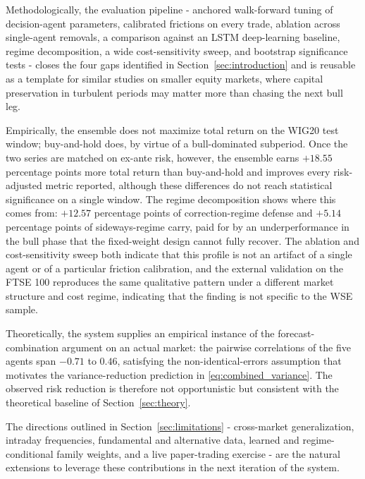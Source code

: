 \documentclass{ieeeaccess}
\newcommand{\VolScaledExcessPP}{\ensuremath{+18.55}}
\newcommand{\CorrectionDefencePP}{\ensuremath{+12.57}}
\newcommand{\SidewaysExcessPP}{\ensuremath{+5.14}}
\newcommand{\CorrMin}{\ensuremath{-0.71}}
\newcommand{\CorrMax}{\ensuremath{0.46}}
\begin{document}
Methodologically, the evaluation pipeline - anchored walk-forward tuning of decision-agent parameters, calibrated frictions on every trade, ablation across single-agent removals, a comparison against an LSTM deep-learning baseline, regime decomposition, a wide cost-sensitivity sweep, and bootstrap significance tests - closes the four gaps identified in Section~\ref{sec:introduction} and is reusable as a template for similar studies on smaller equity markets, where capital preservation in turbulent periods may matter more than chasing the next bull leg.

Empirically, the ensemble does not maximize total return on the WIG20 test window; buy-and-hold does, by virtue of a bull-dominated subperiod. Once the two series are matched on ex-ante risk, however, the ensemble earns $\VolScaledExcessPP$ percentage points more total return than buy-and-hold and improves every risk-adjusted metric reported, although these differences do not reach statistical significance on a single window. The regime decomposition shows where this comes from: $\CorrectionDefencePP$ percentage points of correction-regime defense and $\SidewaysExcessPP$ percentage points of sideways-regime carry, paid for by an underperformance in the bull phase that the fixed-weight design cannot fully recover. The ablation and cost-sensitivity sweep both indicate that this profile is not an artifact of a single agent or of a particular friction calibration, and the external validation on the FTSE 100 reproduces the same qualitative pattern under a different market structure and cost regime, indicating that the finding is not specific to the WSE sample.

Theoretically, the system supplies an empirical instance of the forecast-combination argument on an actual market: the pairwise correlations of the five agents span $\CorrMin$ to $\CorrMax$, satisfying the non-identical-errors assumption that motivates the variance-reduction prediction in \eqref{eq:combined_variance}. The observed risk reduction is therefore not opportunistic but consistent with the theoretical baseline of Section~\ref{sec:theory}.

The directions outlined in Section~\ref{sec:limitations} - cross-market generalization, intraday frequencies, fundamental and alternative data, learned and regime-conditional family weights, and a live paper-trading exercise - are the natural extensions to leverage these contributions in the next iteration of the system.




\EOD
\end{document}
